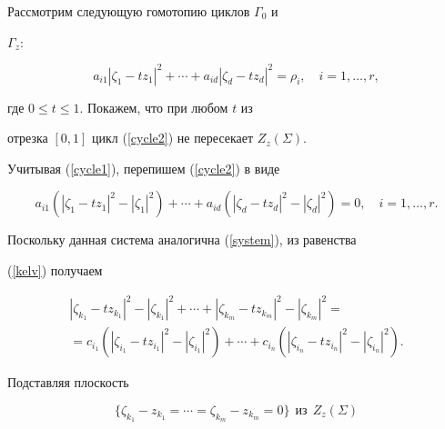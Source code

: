 \begin{pf}


Рассмотрим следующую гомотопию циклов $\Gamma_0$ и


$\Gamma_{z}$:


\begin{equation}


a_{i1}|\zeta_1-tz_1|^2+\dotsb+a_{id}|\zeta_d-tz_d|^2=\rho_i,\quad


i=1,\dotsc,r,


\label{cycle2}


\end{equation}


где $0\leqslant t \leqslant 1$. Покажем, что при любом $t$ из


отрезка $[0,1]$ цикл (\ref{cycle2}) не пересекает $Z_{z}(\Sigma)$.





Учитывая (\ref{cycle1}), перепишем (\ref{cycle2}) в виде


$$


a_{i1}(|\zeta_1-tz_1|^2-|\zeta_1|^2)+\dotsb+a_{id}


(|\zeta_d-tz_d|^2-|\zeta_d|^2)=0, \quad


i=1,\dotsc,r.


$$


Поскольку данная система аналогична (\ref{system}), из равенства 


(\ref{kelv}) получаем


\begin{multline}


|\zeta_{k_1}-tz_{k_1}|^2-|\zeta_{k_1}|^2+\dotsb+|\zeta_{k_m}-tz_{k_m}|^2-


|\zeta_{k_m}|^2 = \\


= c_{i_1}(|\zeta_{i_1}-tz_{i_1}|^2-|\zeta_{i_1}|^2)+\dotsb+c_{i_n}


(|\zeta_{i_n}-tz_{i_n}|^2-|\zeta_{i_n}|^2).


\label{kelc}


\end{multline}


Подставляя плоскость


\begin{equation}\label{14}


\{\zeta_{k_1}-z_{k_1}=\dotsb=\zeta_{k_m}-z_{k_m}=0\}


\ \ \text{из} \ \ Z_{z}(\Sigma)


\end{equation}



\end{pf}
